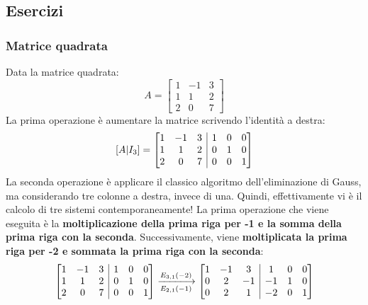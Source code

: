\documentclass[a4paper]{article}
\makeatletter
\newenvironment{rowequmatbra}[1]{\left[\array{@{}#1@{}}}{\endarray\right]}
\makeatother
\begin{document}
	\subsection{Esercizi}
	
	\subsubsection{Matrice quadrata}
	
	Data la matrice quadrata:
	\begin{equation*}
		A = \begin{bmatrix}
			1 & -1 & 3 \\
			1 &  1 & 2 \\
			2 &  0 & 7
		\end{bmatrix}
	\end{equation*}
	La \textcolor{Red3}{prima operazione} è aumentare la matrice scrivendo l'identità a destra:
	\begin{equation*}
		\left[A | I_{3}\right] = \begin{rowequmatbra}{ccc|ccc}
			1 & -1 & 3 & 1 & 0 & 0 \\
			1 &  1 & 2 & 0 & 1 & 0 \\
			2 &  0 & 7 & 0 & 0 & 1
		\end{rowequmatbra}
	\end{equation*}
	La \textcolor{Red3}{seconda operazione} è applicare il classico algoritmo dell'eliminazione di Gauss, ma considerando tre colonne a destra, invece di una. Quindi, effettivamente vi è il calcolo di tre sistemi contemporaneamente! La prima operazione che viene eseguita è la \textbf{moltiplicazione della prima riga per -1 e la somma della prima riga con la seconda}. Successivamente, viene \textbf{moltiplicata la prima riga per -2 e sommata la prima riga con la seconda}:
	\begin{equation*}
		\begin{rowequmatbra}{ccc|ccc}
			1 & -1 & 3 & 1 & 0 & 0 \\
			1 &  1 & 2 & 0 & 1 & 0 \\
			2 &  0 & 7 & 0 & 0 & 1
		\end{rowequmatbra} \xlongrightarrow[E_{2,1}\left(-1\right)]{E_{3,1}\left(-2\right)}
		\begin{rowequmatbra}{ccc|ccc}
			1 & -1 &  3 &  1 & 0 & 0 \\
			0 &  2 & -1 & -1 & 1 & 0 \\
			0 &  2 &  1 & -2 & 0 & 1
		\end{rowequmatbra}
	\end{equation*}
\end{document}
